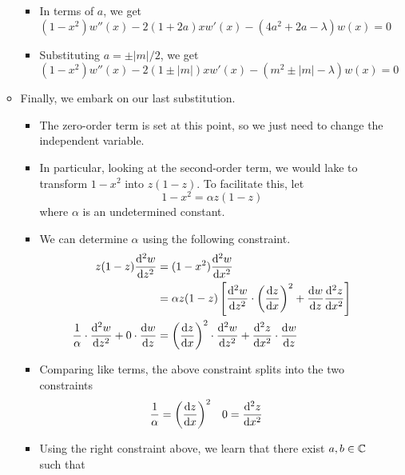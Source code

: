 \documentclass[../finalProject.tex]{subfiles}
\begin{document}
\begin{itemize}
\begin{itemize}
        \begin{itemize}
            \item In terms of $a$, we get
            \begin{equation*}
                (1-x^2)w''(x)-2(1+2a)xw'(x)-(4a^2+2a-\lambda)w(x) = 0
            \end{equation*}
            \item Substituting $a=\pm|m|/2$, we get
            \begin{equation*}
                (1-x^2)w''(x)-2(1\pm|m|)xw'(x)-(m^2\pm|m|-\lambda)w(x) = 0
            \end{equation*}
        \end{itemize}
        \item Finally, we embark on our last substitution.
        \begin{itemize}
            \item The zero-order term is set at this point, so we just need to change the independent variable.
            \item In particular, looking at the second-order term, we would lake to transform $1-x^2$ into $z(1-z)$. To facilitate this, let
            \begin{equation*}
                1-x^2 = \alpha z(1-z)
            \end{equation*}
            where $\alpha$ is an undetermined constant.
            \item We can determine $\alpha$ using the following constraint.
            \begin{align*}
                z(1-z)\dv[2]{w}{z} &= (1-x^2)\dv[2]{w}{x}\\
                &= \alpha z(1-z)\left[ \dv[2]{w}{z}\cdot\left( \dv{z}{x} \right)^2+\dv{w}{z}\dv[2]{z}{x} \right]\\
                \frac{1}{\alpha}\cdot\dv[2]{w}{z}+0\cdot\dv{w}{z} &= \left( \dv{z}{x} \right)^2\cdot\dv[2]{w}{z}+\dv[2]{z}{x}\cdot\dv{w}{z}
            \end{align*}
            \item Comparing like terms, the above constraint splits into the two constraints
            \begin{align*}
                \frac{1}{\alpha} &= \left( \dv{z}{x} \right)^2&
                0 &= \dv[2]{z}{x}
            \end{align*}
            \item Using the right constraint above, we learn that there exist $a,b\in\mathbb{C}$ such that
            \begin{equation*}

\end{equation*}
\end{itemize}
\end{itemize}
\end{itemize}
\end{document}
